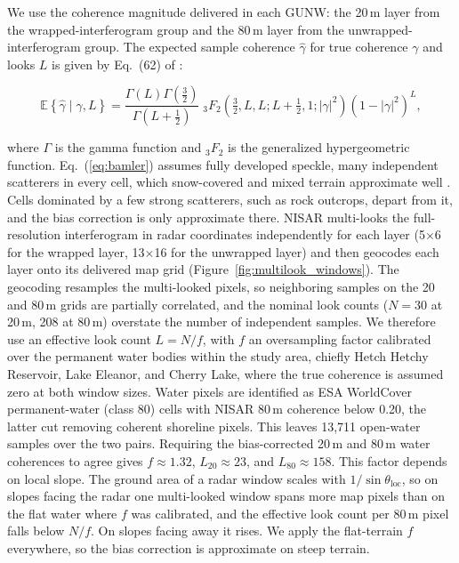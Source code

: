 \documentclass[tc, manuscript]{copernicus}
\begin{document}
We use the coherence magnitude delivered in each GUNW: the 20\,\unit{m} layer from the wrapped-interferogram group and the 80\,\unit{m} layer from the unwrapped-interferogram group. The expected sample coherence $\hat{\gamma}$ for true coherence $\gamma$ and looks $L$ is given by Eq.~(62) of \citet{Bamler1998}:

\begin{equation}
\mathbb{E}\!\left\{\hat{\gamma}\mid\gamma,L\right\}
= \frac{\Gamma(L)\Gamma\!\left(\tfrac{3}{2}\right)}{\Gamma\!\left(L+\tfrac{1}{2}\right)}\;
{}_{3}F_{2}\!\left(\tfrac{3}{2},L,L;L+\tfrac{1}{2},1;|\gamma|^{2}\right)
\left(1-|\gamma|^{2}\right)^{L},
\label{eq:bamler}
\end{equation}

\noindent where $\Gamma$ is the gamma function and ${}_{3}F_{2}$ is the generalized hypergeometric function. Eq.~(\ref{eq:bamler}) assumes fully developed speckle, many independent scatterers in every cell, which snow-covered and mixed terrain approximate well \citep{zwieback2021repeat-pass-693}. Cells dominated by a few strong scatterers, such as rock outcrops, depart from it, and the bias correction is only approximate there. NISAR multi-looks the full-resolution interferogram in radar coordinates independently for each layer (5$\times$6 for the wrapped layer, 13$\times$16 for the unwrapped layer) and then geocodes each layer onto its delivered map grid (Figure~\ref{fig:multilook_windows}). The geocoding resamples the multi-looked pixels, so neighboring samples on the 20 and 80\,\unit{m} grids are partially correlated, and the nominal look counts ($N = 30$ at 20\,\unit{m}, 208 at 80\,\unit{m}) overstate the number of independent samples. We therefore use an effective look count $L=N/f$, with $f$ an oversampling factor calibrated over the permanent water bodies within the study area, chiefly Hetch Hetchy Reservoir, Lake Eleanor, and Cherry Lake, where the true coherence is assumed zero at both window sizes. Water pixels are identified as ESA WorldCover permanent-water (class 80) cells with NISAR 80\,\unit{m} coherence below 0.20, the latter cut removing coherent shoreline pixels. This leaves 13,711 open-water samples over the two pairs. Requiring the bias-corrected 20\,\unit{m} and 80\,\unit{m} water coherences to agree gives $f \approx 1.32$, $L_{20} \approx 23$, and $L_{80} \approx 158$. This factor depends on local slope. The ground area of a radar window scales with $1/\sin\theta_\mathrm{loc}$, so on slopes facing the radar one multi-looked window spans more map pixels than on the flat water where $f$ was calibrated, and the effective look count per 80\,\unit{m} pixel falls below $N/f$. On slopes facing away it rises. We apply the flat-terrain $f$ everywhere, so the bias correction is approximate on steep terrain.
\end{document}
